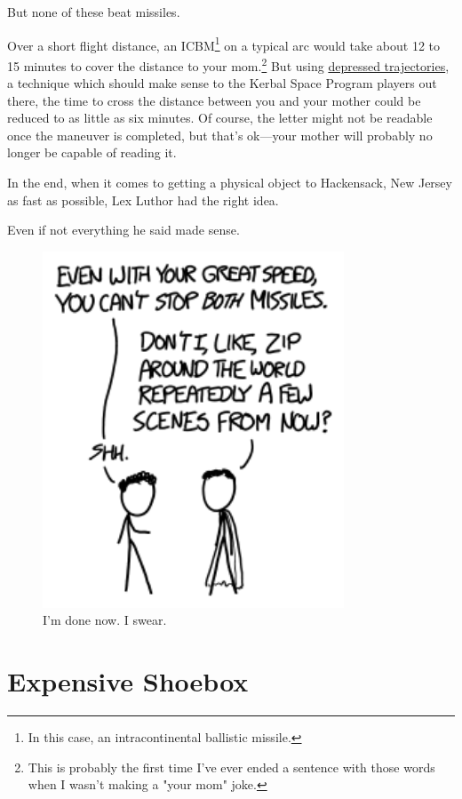 {{But none of these beat missiles.}

{Over a short flight distance, an ICBM{\footnote{In this case, an intracontinental ballistic missile.} } on a typical arc would take about 12 to 15 minutes to cover the distance to your mom.{\footnote{This is probably the first time I've ever ended a sentence with those words when I wasn't making a "your mom" joke.} } But using \href{https://www.princeton.edu/sgs/publications/sgs/pdf/3\_1-2gronlund.pdf}{depressed trajectories}, a technique which should make sense to the Kerbal Space Program players out there, the time to cross the distance between you and your mother could be reduced to as little as six minutes. Of course, the letter might not be readable once the maneuver is completed, but that's ok—your mother will probably no longer be capable of reading it.}

{In the end, when it comes to getting a physical object to Hackensack, New Jersey as fast as possible, Lex Luthor had the right idea.}

{Even if not everything he said made sense.}

\begin{figure}[!htbp]
\centering
\includegraphics[scale=0.5, max width=0.8\textwidth]{imgs/a/107/lex.png}
\caption{I'm done now. I swear.}
\end{figure}

{
\chapter{Expensive Shoebox}
}

}
